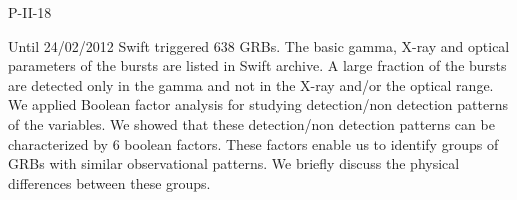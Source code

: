 P-II-18


\bigskip



\bigskip

\noindent Until 24/02/2012 Swift triggered 638 GRBs.  The basic gamma, X-ray and optical parameters of the bursts are listed in Swift archive.  A large fraction of the bursts are detected only in the gamma and not in the X-ray and/or the optical range.  We applied Boolean factor analysis for studying detection/non detection patterns of the variables.  We showed that these detection/non detection patterns can be characterized by 6 boolean factors.  These factors enable us to identify groups of GRBs with similar observational patterns.  We briefly discuss the physical differences between these groups.
